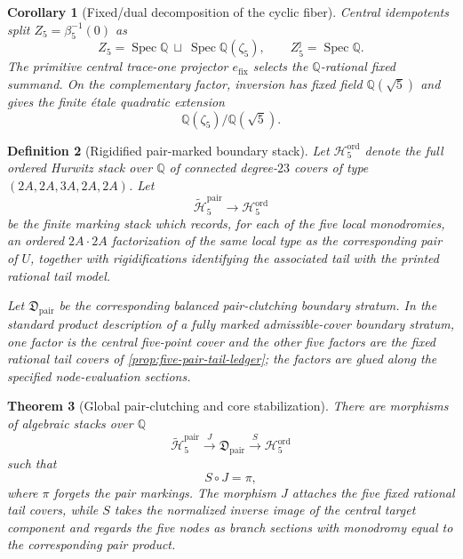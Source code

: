 \documentclass[11pt]{article}
\newtheorem{theorem}{Theorem}[section]
\newtheorem{corollary}[theorem]{Corollary}
\newtheorem{definition}[theorem]{Definition}
\theoremstyle{remark}
\newcommand{\Q}{\mathbb Q}
\newcommand{\Spec}{\operatorname{Spec}}
\begin{document}
\begin{corollary}[Fixed/dual decomposition of the cyclic fiber]
\label{cor:beta5-fixed-dual}
Central idempotents split $Z_5=\beta_5^{-1}(0)$ as
\[
 \boxed{
 Z_5
 =\Spec\Q\ \sqcup\ \Spec\Q(\zeta_5),
 \qquad
 Z_5^\jmath=\Spec\Q.
 }
\]
The primitive central trace-one projector $e_{\mathrm{fix}}$ selects the $\Q$-rational fixed summand.  On the complementary factor, inversion has fixed field $\Q(\sqrt5)$ and gives the finite \'etale quadratic extension
\[
 \Q(\zeta_5)/\Q(\sqrt5).
\]
\end{corollary}

\begin{definition}[Rigidified pair-marked boundary stack]
\label{def:pair-marked-boundary}
Let $\mathcal H_5^{\mathrm{ord}}$ denote the full ordered Hurwitz stack over $\Q$ of
connected degree-$23$ covers of type $(2A,2A,3A,2A,2A)$.  Let
\[
 \widetilde{\mathcal H}_5^{\mathrm{pair}}
 \longrightarrow
 \mathcal H_5^{\mathrm{ord}}
\]
be the finite marking stack which records, for each of the five local
monodromies, an ordered $2A\cdot2A$ factorization of the same local type as
the corresponding pair of $U$, together with rigidifications identifying
the associated tail with the printed rational tail model.

Let $\mathfrak D_{\mathrm{pair}}$ be the corresponding balanced pair-clutching boundary stratum.  In the standard product description of a fully marked admissible-cover boundary stratum, one factor is the central five-point cover and the other five factors are the fixed rational tail covers of \cref{prop:five-pair-tail-ledger}; the factors are glued along the specified node-evaluation sections.
\end{definition}

\begin{theorem}[Global pair-clutching and core stabilization]
\label{thm:global-pair-stabilization}
There are morphisms of algebraic stacks over $\Q$
\[
 \widetilde{\mathcal H}_5^{\mathrm{pair}}
 \xrightarrow{\ J\ }
 \mathfrak D_{\mathrm{pair}}
 \xrightarrow{\ S\ }
 \mathcal H_5^{\mathrm{ord}}
\]
such that
\[
 \boxed{S\circ J=\pi,}
\]
where $\pi$ forgets the pair markings.  The morphism $J$ attaches the five
fixed rational tail covers, while $S$ takes the normalized inverse image of
the central target component and regards the five nodes as branch sections
with monodromy equal to the corresponding pair product.
\end{theorem}
\end{document}
